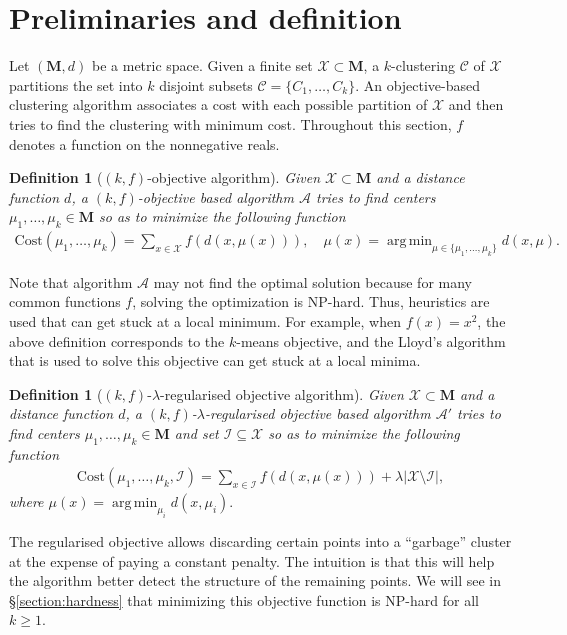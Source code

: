 \documentclass[12pt]{article}
\newcommand{\mc}{\mathcal}
\newcommand{\mb}{\mathbf}
\DeclareMathOperator*{\argmin}{arg\,min}
\newtheorem{definition}[theorem]{Definition}
\begin{document}
\section{Preliminaries and definition}
\label{sec:pre}

Let $(\mb M, d)$ be a metric space. Given a finite set $\mc X \subset \mb M$, a $k$-clustering $\mc C$ of $\mc X$ partitions the set into $k$ disjoint subsets $\mc C = \{C_1, \ldots, C_k\}$. An objective-based clustering algorithm associates a cost with each possible partition of $\mc X$ and then tries to find the clustering with minimum cost. Throughout this section, $f$ denotes a function on the nonnegative reals.

\begin{definition}[$(k, f)$-objective algorithm] Given $\mc X\subset \mb M$ and a distance function $d$, a $(k, f)$-objective based algorithm $\mc A$ tries to find centers $\mu_1, \ldots, \mu_k \in \mb M$ so as to minimize the following function
\begin{align}
\label{eqn:kfObjectiveAlg}
\text{Cost}(\mu_1, \ldots, \mu_k) = \sum_{x\in \mc X} f(d(x, \mu(x))), \quad \mu(x) = \argmin_{\mu \in \{\mu_1, \ldots, \mu_k\}} d(x, \mu).
\end{align}
\end{definition}
Note that algorithm $\mc A$ may not find the optimal solution because for many common functions $f$, solving the optimization is NP-hard. Thus, heuristics are used that can get stuck at a local minimum. For example, when $f(x) = x^2$, the above definition corresponds to the $k$-means objective, and the Lloyd's algorithm that is used to solve this objective can get stuck at a local minima. 

\begin{definition}[$(k, f)$-$\lambda$-regularised objective algorithm] Given $\mc X\subset \mb M$ and a distance function $d$, a $(k, f)$-$\lambda$-regularised objective based algorithm $\mc A'$ tries to find centers $\mu_1, \ldots, \mu_k \in \mb M$ and set $\mc I\subseteq \mc X$ so as to minimize the following function
\begin{align}
\label{eqn:kfObjectiveAlg}
\text{Cost}(\mu_1, \ldots, \mu_k, \mc I) = \sum_{x\in \mc I} f(d(x, \mu(x))) + \lambda |\mc X \setminus \mc I|,
\end{align}
where $\mu(x) = \argmin_{\mu_i} d(x, \mu_i).$
\end{definition}

The regularised objective allows discarding certain points into a ``garbage'' cluster at the expense of paying a constant penalty. The intuition is that this will help the algorithm better detect the structure of the remaining points. We will see in \S \ref{section:hardness} that minimizing this objective function is NP-hard for all $k \ge 1$.
\end{document}
